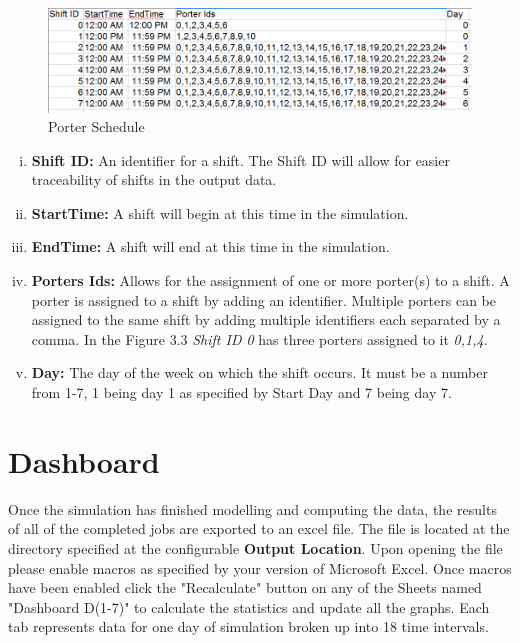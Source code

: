 \documentclass[paper=letter, fontsize=10pt]{scrartcl}
\numberwithin{equation}{section}		%
\numberwithin{figure}{section}			%
\numberwithin{table}{section}				%
\begin{document}
	\begin{figure}[!htbp]
	\begin{center}
		\includegraphics[width=1\columnwidth, height=0.5\textheight, keepaspectratio]{Schedule.png}
		\caption{Porter Schedule}
	\end{center}
	\end{figure}
	
	\begin{enumerate}[(i)]
		\item \textbf{Shift ID:} An identifier for a shift.  The Shift ID will allow for easier traceability of shifts in the output data.
		\item \textbf{StartTime:} A shift will begin at this time in the simulation.
		\item \textbf{EndTime:} A shift will end at this time in the simulation.
		\item \textbf{Porters Ids:} Allows for the assignment of one or more porter(s) to a shift.  A porter is assigned to a shift by adding an identifier.  Multiple porters can be assigned to the same shift by adding multiple identifiers each separated by a comma.  In the Figure 3.3 \textit{Shift ID 0} has three  porters assigned to it \textit{0,1,4}.
		\item \textbf{Day:} The day of the week on which the shift occurs.  It must be a number from 1-7, 1 being day 1 as specified by Start Day and 7 being day 7.
	\end{enumerate}

\newpage
\section{Dashboard}
Once the simulation has finished modelling and computing the data, the results of all of the completed jobs are exported to an excel file. The file is located at the directory specified at the configurable \textbf{Output Location}. Upon opening the file please enable macros as specified by your version of Microsoft Excel. Once macros have been enabled click the "Recalculate" button on any of the Sheets named "Dashboard D(1-7)" to calculate the statistics and update all the graphs. Each tab represents data for one day of simulation broken up into 18 time intervals.
\end{document}
